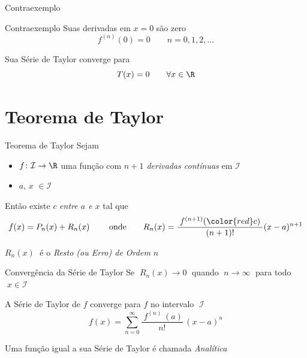 \begin{frame}{Contraexemplo}
  \centering
  \scalebox{0.8}{}
\end{frame}

\begin{frame}{Contraexemplo}
  Suas derivadas em \(x=0\) são zero
  \[
    f^{(n)}(0) = 0 \qquad n = 0, 1, 2, \dots
  \]

  \pause
  \vspace{\baselineskip}
  Sua Série de Taylor converge para
  \[
    T(x) = 0 \qquad \forall x \in \R
  \]
\end{frame}

\section{Teorema de Taylor}

\begin{frame}{Teorema de Taylor}
  Sejam
  \begin{itemize}
  \item \(f\colon\mathcal{I}\rightarrow \R\) uma função com \emph{$n+1$
        derivadas contínuas} em $\mathcal{I}$
  \item $a$, $x$ $\in\mathcal{I}$
  \end{itemize}

  \pause
  \vspace{\baselineskip}
  Então existe {\color{red}\(c\)} \emph{entre \(a\) e \(x\)} \pause tal que
  \[
    f(x)=P_n(x)+R_n(x)\
    \qquad \text{onde} \qquad
    R_n(x)=\frac{\;f^{(n+1)}({\color{red}c})\;}{(n+1)!}(x-a)^{n+1}
  \]

  \vspace{.5\baselineskip}
  $R_n(x)\;$ é o \emph{Resto (ou Erro) de Ordem $n$}
\end{frame}

\begin{frame}{Convergência da Série de Taylor}
Se \emph{\(\;R_n(x)\to 0\;\)} quando \emph{\(\;n\to\infty\;\)}
para todo \(\;x\in\mathcal{I}\;\)

\pause
\vspace{\baselineskip}
A Série de Taylor de $f$ converge para $f$ no intervalo \(\;\mathcal{I}\;\)
\[
  f(x) = \sum_{n=0}^\infty \frac{\;f^{(n)\;}(a)}{n!}\,(x-a)^n
\]

\pause
Uma função igual a sua Série de Taylor é chamada \emph{Analítica}
\end{frame}

